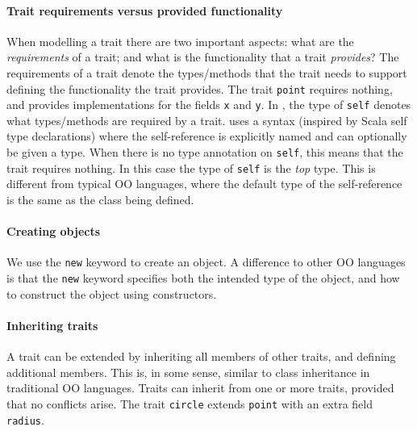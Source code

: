 \paragraph{Trait requirements versus provided functionality}
When modelling a trait there are two important aspects: what are the
\emph{requirements} of a trait; and what is the functionality that a trait
\emph{provides}? The requirements of a trait denote the types/methods that the
trait needs to support defining the functionality the trait provides. The trait
\lstinline{point} requires nothing, and provides implementations for the fields
\lstinline{x} and \lstinline{y}. In \name, the type of \lstinline$self$ denotes
what types/methods are required by a trait. \name uses a syntax (inspired by
Scala self type declarations) where the self-reference is explicitly named and
can optionally be given a type. When there is no type annotation on
\lstinline{self}, this means that the trait requires nothing. In this case the
type of \lstinline{self} is the \emph{top} type. This is different from typical
OO languages, where the default type of the self-reference is the same as the class being
defined.


\paragraph{Creating objects}
We use the \lstinline{new} keyword to create an object. A difference to other OO
languages is that the \lstinline{new} keyword specifies both the intended type
of the object, and how to construct the object using constructors.

\paragraph{Inheriting traits}
A trait can be extended by inheriting all members of
other traits, and defining additional members. This is, in some sense, similar
to class inheritance in traditional OO languages. Traits can inherit
from one or more traits, provided that
no conflicts arise. The trait \lstinline$circle$ extends
\lstinline{point} with an extra field \lstinline{radius}.


